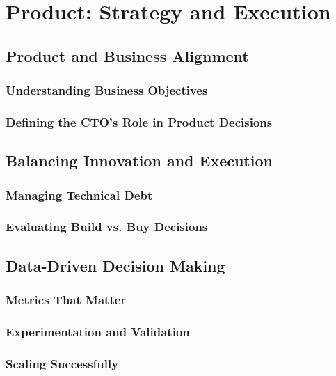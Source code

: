 \chapter{Product: Strategy and Execution}
\section{Product and Business Alignment}
\subsection{Understanding Business Objectives}
\subsection{Defining the CTO’s Role in Product Decisions}
\section{Balancing Innovation and Execution}
\subsection{Managing Technical Debt}
\subsection{Evaluating Build vs. Buy Decisions}
\section{Data-Driven Decision Making}
\subsection{Metrics That Matter}
\subsection{Experimentation and Validation}
\subsection{Scaling Successfully}